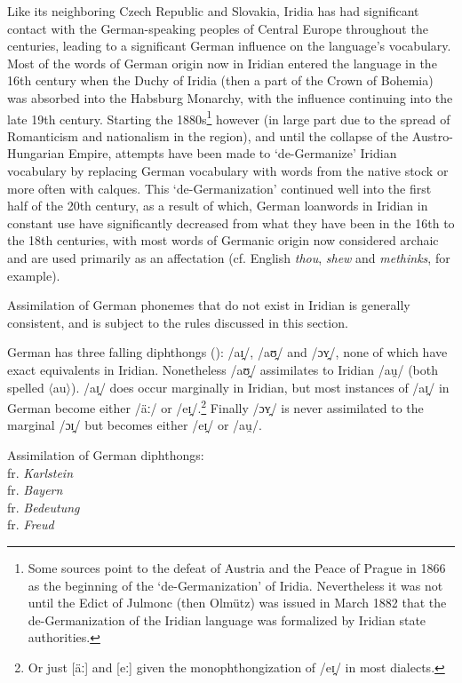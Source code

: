 Like its neighboring Czech Republic and Slovakia, Iridia has had significant contact with the German-speaking peoples of Central Europe throughout the centuries, leading to a significant German influence on the language's vocabulary. Most of the words of German origin now in Iridian entered the language in the 16th century when the Duchy of Iridia (then a part of the Crown of Bohemia) was absorbed into the Habsburg Monarchy, with the influence continuing into the late 19th century. Starting the 1880s\footnote{Some sources point to the defeat of Austria and the Peace of Prague in 1866 as the beginning of the `de-Germanization' of Iridia. Nevertheless it was not until the Edict of Julmonc (then Olmütz) was issued in March 1882 that the de-Germanization of the Iridian language was formalized by Iridian state authorities.} however (in large part due to the spread of Romanticism and nationalism in the region), and until the collapse of the Austro-Hungarian Empire, attempts have been made to `de-Germanize' Iridian vocabulary by replacing German vocabulary with words from the native stock or more often with calques. This `de-Germanization' continued well into the first half of the 20th century, as a result of which, German loanwords in Iridian in constant use have significantly decreased from what they have been in the 16th to the 18th centuries, with most words of Germanic origin now considered archaic and are used primarily as an affectation (cf. English \emph{thou}, \emph{shew} and \emph{methinks}, for example).

Assimilation of German phonemes that do not exist in Iridian is generally consistent, and is subject to the rules discussed in this section.

German has three falling diphthongs (\cite{wiese1996}): /aɪ̯/, /aʊ̯/ and /ɔʏ̯/, none of which have exact equivalents in Iridian. Nonetheless /aʊ̯/ assimilates to Iridian /au̯/ (both spelled $\langle$au$\rangle$). /aɪ̯/ does occur marginally in Iridian, but most instances of /aɪ̯/ in German become either /äː/ or /eɪ̯/.\footnote{Or just [äː] and [eː] given the monophthongization of /eɪ̯/ in most dialects.} Finally /ɔʏ̯/ is never assimilated to the marginal /ɔɪ̯/ but becomes either /eɪ̯/ or /au̯/.


\ex
Assimilation of German diphthongs:\\
 fr. \emph{Karlstein}\\
 fr. \emph{Bayern}\\
 fr. \emph{Bedeutung}\\
 fr. \emph{Freud}
\xe

